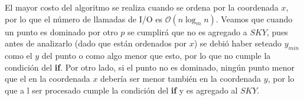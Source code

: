 \documentclass[dcc,uchile]{fcfmcourse}
\theoremstyle{plain}
\theoremstyle{definition}
\begin{document}
\begin{problems}
\begin{enumerate}[a)]
    El mayor costo del algoritmo se realiza cuando se ordena por la coordenada $x$, por lo que el número de llamadas de I/O es $\mathcal{O}(n\log_{m}n)$. Veamos que cuando un punto es dominado por otro $p$ se cumplirá que no es agregado a $SKY$, pues antes de analizarlo (dado que están ordenados por $x$) se debió haber seteado $y_{min}$ como el $y$ del punto o como algo menor que esto, por lo que no cumple la condición del \textbf{if}. Por otro lado, si el punto no es dominado, ningún punto menor que el en la coordenada $x$ debería ser menor también en la coordenada $y$, por lo que a l ser procesado cumple la condición del \textbf{if} y es agregado al $SKY$.
\end{enumerate}
\end{problems}
\end{document}
